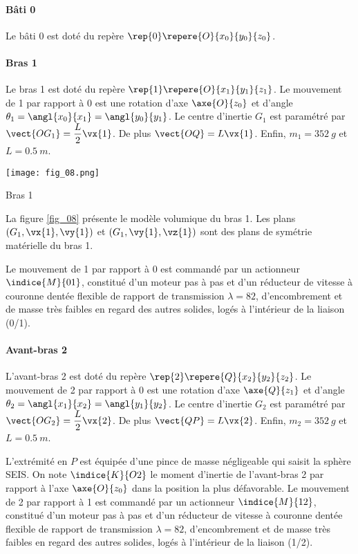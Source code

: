 \paragraph*{Bâti 0}
Le bâti 0 est doté du repère $\rep{0} \repere{O}{x_0}{y_0}{z_0}$.

\paragraph*{Bras 1}

Le bras 1 est doté du repère $\rep{1} \repere{O}{x_1}{y_1}{z_1}$. Le mouvement de 1 par rapport à 0 est une rotation d'axe $\axe{O}{z_0}$  et d'angle $\theta_1 = \angl{x_0}{x_1}= \angl{y_0}{y_1}$. Le centre d'inertie $G_1$ est paramétré par $\vect{OG_1} = \dfrac{L}{2} \vx{1}$. De plus $\vect{OQ} = L\vx{1}$. Enfin, $m_1 = \SI{352}{g}$ et $L=\SI{0,5}{m}$.


\begin{marginfigure}
\texttt{[image: fig\_08.png]}
\caption{Bras 1 \label{fig_08}}
\end{marginfigure}

La figure \ref{fig_08} présente le modèle volumique du bras 1. Les plans $\left(G_1,\vx{1},\vy{1}\right)$  et $\left(G_1,\vy{1},\vz{1}\right)$ sont des plans de symétrie matérielle du bras 1.


Le mouvement de 1 par rapport à 0 est commandé par un actionneur $\indice{M}{01}$, constitué d’un moteur pas à pas et d’un réducteur de vitesse à couronne dentée flexible de rapport de transmission $\lambda = 82$, d’encombrement et de masse très faibles en regard des autres solides, logés à l’intérieur de la liaison (0/1).


\paragraph*{Avant-bras 2}
L'avant-bras 2 est doté du repère $\rep{2} \repere{Q}{x_2}{y_2}{z_2}$. Le mouvement de 2 par rapport à 0 est une rotation d'axe $\axe{Q}{z_1}$  et d'angle $\theta_2 = \angl{x_1}{x_2}= \angl{y_1}{y_2}$. Le centre d'inertie $G_2$ est paramétré par $\vect{OG_2} = \dfrac{L}{2} \vx{2}$. De plus $\vect{QP} = L\vx{2}$. Enfin, $m_2 = \SI{352}{g}$ et $L=\SI{0,5}{m}$.

L’extrémité en $P$ est équipée d’une pince de masse négligeable qui saisit la sphère SEIS. On note $\indice{K}{O2}$ le moment d'inertie de l'avant-bras 2 par rapport à l’axe $\axe{O}{z_0}$ dans la position la plus défavorable.  Le mouvement de 2 par rapport à 1 est commandé par un actionneur $\indice{M}{12}$, constitué d’un moteur pas à pas et d’un réducteur de vitesse à couronne dentée flexible de rapport de transmission $\lambda = 82$, d’encombrement et de masse très faibles en regard des autres solides, logés à l’intérieur de la liaison (1/2).


